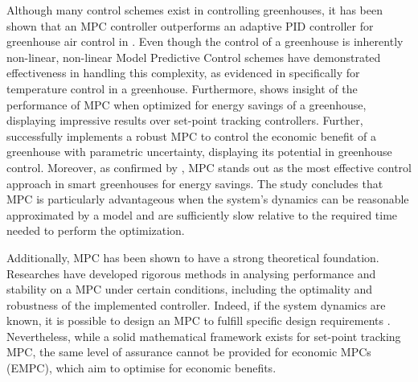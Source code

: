 Although many control schemes exist in controlling greenhouses, it has been shown that an MPC controller outperforms an adaptive PID controller for greenhouse air control in \cite{ghoumariNonlinearConstrainedMPC2005}. Even though the control of a greenhouse is inherently non-linear, non-linear Model Predictive Control schemes have demonstrated effectiveness in handling this complexity, as evidenced in \cite{gruberNonlinearMPCBased2011, montoyaHybridcontrolledApproachMaintaining2016} specifically for temperature control in a greenhouse. Furthermore, \cite{bersaniModelPredictiveControl2020} shows insight of the performance of MPC when optimized for energy savings of a greenhouse, displaying impressive results over set-point tracking controllers. Further, \cite{boersmaRobustSamplebasedModel2022} successfully implements a robust MPC to control the economic benefit of a greenhouse with parametric uncertainty, displaying its potential in greenhouse control. Moreover, as confirmed by \cite{bersaniModelPredictiveControl2020}, MPC stands out as the most effective control approach in smart greenhouses for energy savings. The study concludes that MPC is particularly advantageous when the system's dynamics can be reasonable approximated by a model and are sufficiently slow relative to the required time needed to perform the optimization.

Additionally, MPC has been shown to have a strong theoretical foundation. Researches have developed rigorous methods in analysing performance and stability on a MPC under certain conditions, including the optimality and robustness of the implemented controller. Indeed, if the system dynamics are known, it is possible to design an MPC to fulfill specific design requirements \cite{rawlingsModelPredictiveControl2017}. Nevertheless, while a solid mathematical framework exists for set-point tracking MPC, the same level of assurance cannot be provided for economic MPCs (EMPC), which aim to optimise for economic benefits.

